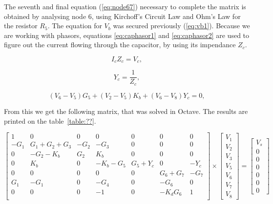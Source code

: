 The seventh and final equation (\ref{eq:node67}) necessary to complete the matrix is obtained by analysing node 6, using Kirchoff's Circuit Law and Ohm's Law for the resistor $R_5$. The equation for $V_b$ was secured previously (\ref{eq:vb1}). Because we are working with phasors, equations \ref{eq:caphasor1} and \ref{eq:caphasor2} are used to figure out the current flowing through the capacitor, by using its impendance $Z_c$.


\begin{equation}
  I_{c}Z_{c} = V_{c},
  \label{eq:caphasor1}
\end{equation}

\begin{equation}
 Y_c = \frac{1}{Z_c},
  \label{eq:caphasor2}
\end{equation}

\begin{equation}
   (V_{6} - V_{5})G_{5} + (V_{2} - V_{5})K_{b} + (V_{6} - V_{8})Y_{c} = 0,
  \label{eq:node67}
\end{equation}

From this we get the following matrix, that was solved in Octave. The results are printed on the table~\ref{table:??}.

\begin{equation}
\left[ \begin{array}{ccccccc} 
		1 & 0 & 0 & 0 & 0 & 0 & 0 \\ 
		-G_1 & G_1+G_2+G_3 & -G_2 & -G_3 & 0 & 0 & 0 \\
		0 & -G_2-K_b & G_2 & K_b & 0 & 0 & 0 \\ 
		0 & K_b & 0 & -K_b-G_5 & G_5+Y_c & 0 & -Y_c  \\ 
		0 & 0 & 0 & 0 & 0 & G_6+G_7 & -G_7  \\ 
		G_1 & -G_1 & 0 & -G_4 & 0 & -G_6 & 0  \\ 
		0 & 0 & 0 & -1 & 0 & -K_dG_6 & 1 \\ 

\end{array} \right]
\times \left[ \begin{array}{c} V_1 \\ V_2 \\ V_3 \\  V_5 \\ V_6 \\ V_7 \\ V_8 \end{array} \right] =
\left[ \begin{array}{c} V_s \\ 0 \\ 0 \\ 0 \\ 0 \\ 0 \\ 0  \end{array} \right]
\label{eq:nodalmatrix4}
\end{equation}








